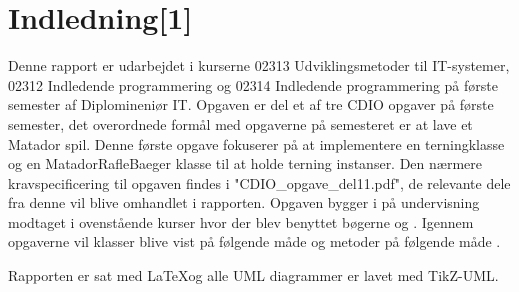 \chapter{Indledning[1]}\label{ch:indledning}
Denne rapport er udarbejdet i kurserne 02313 Udviklingsmetoder til IT-systemer, 02312 Indledende programmering og 02314 Indledende programmering på første semester af Diplomineniør IT. Opgaven er del et af tre CDIO opgaver på første semester, det overordnede formål med opgaverne på semesteret er at lave et Matador spil. Denne første opgave fokuserer på at implementere en terningklasse og en MatadorRafleBaeger klasse til at holde terning instanser. Den nærmere kravspecificering til opgaven findes i "CDIO\_opgave\_del11.pdf"\cite{CDIOdel1}, de relevante dele fra denne vil blive omhandlet i rapporten. Opgaven bygger i på undervisning modtaget i ovenstående kurser hvor der blev benyttet bøgerne \cite{umlbook} og \cite{javabook}. Igennem opgaverne vil klasser blive vist på følgende måde  og metoder på følgende måde .

Rapporten er sat med \LaTeX og alle UML diagrammer er lavet med TikZ-UML.

